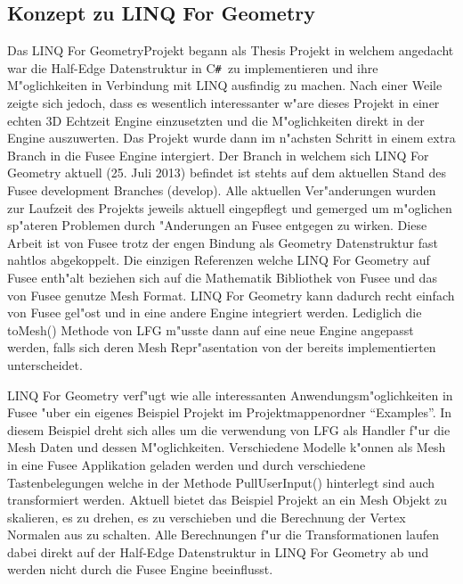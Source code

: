 \documentclass[pagesize, paper=a4, fontsize=12pt,titlepage=true, headings=small, headnosepline, abstractoff, liststotoc, nochapterprefix, plainheadsepline]{scrreprt}
\newcommand{\CSS}{C\texttt{\# }}
\newcommand{\LFG}{LINQ For Geometry}
\newcommand{\LFGS}{LINQ For Geometry }
\newcommand{\HES}{Half-Edge Datenstruktur }
\begin{document}
		\subsection {Konzept zu \LFG}
			Das \LFG Projekt begann als Thesis Projekt in welchem angedacht war die \HES in \CSS zu implementieren und ihre M"oglichkeiten in Verbindung mit LINQ ausfindig zu machen. Nach einer Weile zeigte sich jedoch, dass es wesentlich interessanter w"are dieses Projekt in einer echten 3D Echtzeit Engine einzusetzten und die M"oglichkeiten direkt in der Engine auszuwerten. Das Projekt wurde dann im n"achsten Schritt in einem extra Branch in die Fusee Engine intergiert. Der Branch in welchem sich \LFGS aktuell (25. Juli 2013) befindet ist stehts auf dem aktuellen Stand des Fusee development Branches (develop). Alle aktuellen Ver"anderungen wurden zur Laufzeit des Projekts jeweils aktuell eingepflegt und gemerged um m"oglichen sp"ateren Problemen durch "Anderungen an Fusee entgegen zu wirken. Diese Arbeit ist von Fusee trotz der engen Bindung als Geometry Datenstruktur fast nahtlos abgekoppelt. Die einzigen Referenzen welche \LFGS auf Fusee enth"alt beziehen sich auf die Mathematik Bibliothek von Fusee und das von Fusee genutze Mesh Format. \LFGS kann dadurch recht einfach von Fusee gel"ost und in eine andere Engine integriert werden. Lediglich die toMesh() Methode von LFG m"usste dann auf eine neue Engine angepasst werden, falls sich deren Mesh Repr"asentation von der bereits implementierten unterscheidet.
\newline

\LFGS verf"ugt wie alle interessanten Anwendungsm"oglichkeiten in Fusee "uber ein eigenes Beispiel Projekt im Projektmappenordner "`Examples"'. In diesem Beispiel dreht sich alles um die verwendung von LFG als Handler f"ur die Mesh Daten und dessen M"oglichkeiten. Verschiedene Modelle k"onnen als Mesh in eine Fusee Applikation geladen werden und durch verschiedene Tastenbelegungen welche in der Methode  PullUserInput() hinterlegt sind auch transformiert werden. Aktuell bietet das Beispiel Projekt an ein Mesh Objekt zu skalieren, es zu drehen, es zu verschieben und die Berechnung der Vertex Normalen aus zu schalten. Alle Berechnungen f"ur die Transformationen laufen dabei direkt auf der \HES in \LFGS ab und werden nicht durch die Fusee Engine beeinflusst.
\newline
\end{document}
